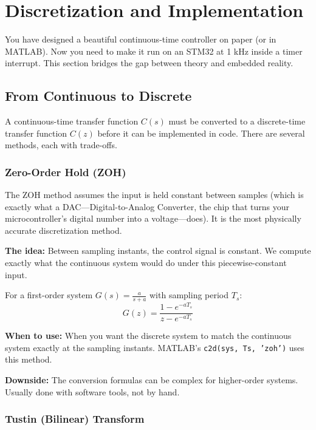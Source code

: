 \section{Discretization and Implementation}

You have designed a beautiful continuous-time controller on paper (or in MATLAB). Now you need to make it run on an STM32 at 1 kHz inside a timer interrupt. This section bridges the gap between theory and embedded reality.

\subsection{From Continuous to Discrete}

A continuous-time transfer function $C(s)$ must be converted to a discrete-time transfer function $C(z)$ before it can be implemented in code. There are several methods, each with trade-offs.

\subsubsection{Zero-Order Hold (ZOH)}

The ZOH method assumes the input is held constant between samples (which is exactly what a DAC---Digital-to-Analog Converter, the chip that turns your microcontroller's digital number into a voltage---does). It is the most physically accurate discretization method.

\textbf{The idea:} Between sampling instants, the control signal is constant. We compute exactly what the continuous system would do under this piecewise-constant input.

For a first-order system $G(s) = \frac{a}{s + a}$ with sampling period $T_s$:
\begin{equation}
G(z) = \frac{1 - e^{-aT_s}}{z - e^{-aT_s}}
\end{equation}

\textbf{When to use:} When you want the discrete system to match the continuous system exactly at the sampling instants. MATLAB's \texttt{c2d(sys, Ts, 'zoh')} uses this method.

\textbf{Downside:} The conversion formulas can be complex for higher-order systems. Usually done with software tools, not by hand.

\subsubsection{Tustin (Bilinear) Transform}

